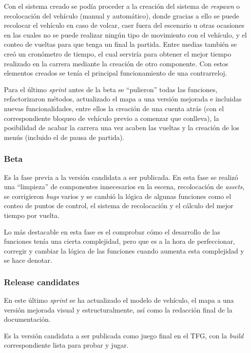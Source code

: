 Con el sistema creado se podía proceder a la creación del sistema de \textit{respawn} o recolocación del vehículo (manual y automático), donde gracias a ello se puede recolocar el vehículo en caso de volcar, caer fuera del escenario u otras ocasiones en las cuales no se puede realizar ningún tipo de movimiento con el vehículo, y el conteo de vueltas para que tenga un final la partida. Entre medias también se creó un cronómetro de tiempo, el cual serviría para obtener el mejor tiempo realizado en la carrera mediante la creación de otro componente. Con estos elementos creados se tenía el principal funcionamiento de una contrarreloj.

Para el último \textit{sprint} antes de la beta se ``pulieron'' todas las funciones, refactorizaron métodos, actualizado el mapa a una versión mejorada e incluidas nuevas funcionalidades, entre ellos la creación de una cuenta atrás (con el correspondiente bloqueo de vehículo previo a comenzar que conlleva), la posibilidad de acabar la carrera una vez acaben las vueltas y la creación de los menús (incluido el de pausa de partida).

\subsubsection{Beta}

Es la fase previa a la versión candidata a ser publicada. En esta fase se realizó una ``limpieza'' de componentes innecesarios en la escena, recolocación de \textit{assets}, se corrigieron \textit{bugs} varios y se cambió la lógica de algunas funciones como el conteo de puntos de control, el sistema de recolocación y el cálculo del mejor tiempo por vuelta.

Lo más destacable en esta fase es el comprobar cómo el desarrollo de las funciones tenía una cierta complejidad, pero que es a la hora de perfeccionar, corregir y cambiar la lógica de las funciones cuando aumenta esta complejidad y se hace denotar.

\subsubsection{Release candidates}

En este último \textit{sprint} se ha actualizado el modelo de vehículo, el mapa a una versión mejorada visual y estructuralmente, así como la redacción final de la documentación.

Es la versión candidata a ser publicada como juego final en el TFG, con la \textit{build} correspondiente lista para probar y jugar.

